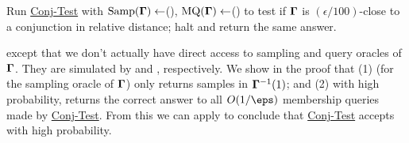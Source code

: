 \documentclass[11pt]{article}
\theoremstyle{definition}
\begin{document}
\begin{algorithm}[H]\begin{algorithmic}[1]\vspace{0.2cm}
    \setcounter{ALG@line}{6}
\State Run \hyperlink{Algorithm2}{\sc Conj-Test}
with $\mathrm{Samp}(\mathbf{\Gamma}) \leftarrow $(), $\mathrm{MQ}(\mathbf{\Gamma}) \leftarrow $()  to test if  
    $\mathbf{\Gamma}$ \Statex  is $(\epsilon/100)$-close to a conjunction in relative distance; halt and return the same answer. \vspace{0.15cm} 
    \end{algorithmic}
\end{algorithm}\medskip

\noindent except that we don't actually have direct access to 
  sampling and query oracles of $\mathbf{\Gamma}$.
They are simulated by  and , respectively.
We show in the proof that (1)  (for the sampling oracle of $\mathbf{\Gamma}$) only returns samples in 
  $\mathbf{\Gamma}^{-1}(1)$; and (2) with high probability,
   returns the correct answer to all $O(1/\eps)$ membership queries made by \hyperlink{Algorithm2}{\sc Conj-Test}.
From this we can apply  to conclude that \hyperlink{Algorithm2}{\sc Conj-Test} accepts with high probability.
  
\end{document}
